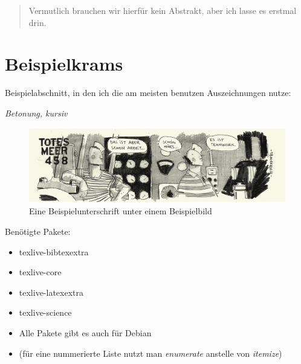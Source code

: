 



\thispagestyle{empty}				%

\printtitle									%
  	\vfill
\printauthor								%
\newpage

\begin{abstract}
Vermutlich brauchen wir hierfür kein Abstrakt, aber ich lasse es erstmal drin.
\end{abstract}

\tableofcontents
\newpage

\section{Beispielkrams}
Beispielabschnitt, in den ich die am meisten benutzen Auszeichnungen nutze:

\emph{Betonung, kursiv}

\begin{figure}[ht!]
    \centering
    \includegraphics[width=\textwidth]{pics/test.png}
    \caption{Eine Beispielunterschrift unter einem Beispielbild}
    \label{fig:test}
\end{figure}

Benötigte Pakete:
\begin{itemize}

  \item texlive-bibtexextra
  \item texlive-core
  \item texlive-latexextra
  \item texlive-science
  \item Alle Pakete gibt es auch für Debian
  \item (für eine nummerierte Liste nutzt man \emph{enumerate} anstelle von
    \emph{itemize})

\end{itemize}

